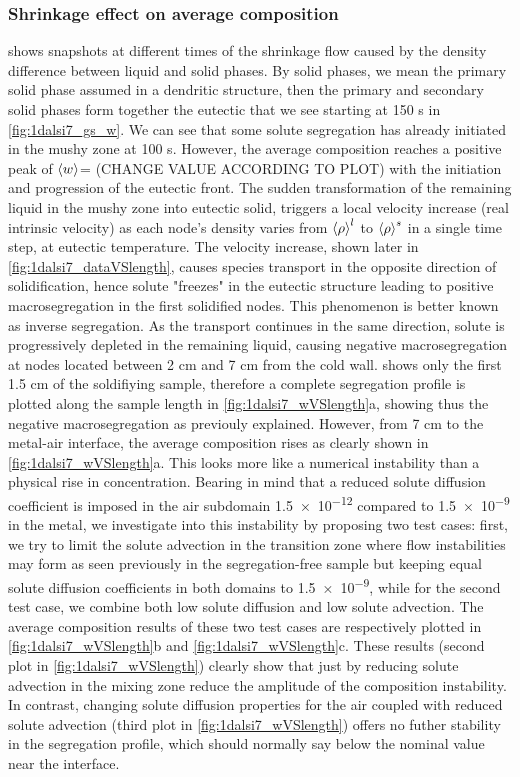 \subsubsection{Shrinkage effect on average composition}
 shows snapshots at different times of the shrinkage flow caused by the density difference between liquid and solid phases.
By solid phases, we mean the primary solid phase assumed in a dendritic structure, then the primary and secondary solid phases form together the eutectic
that we see starting at 150 s in \cref{fig:1dalsi7_gs_w}. We can see that some solute segregation has already initiated in the mushy zone at 100 s.
However, the average composition reaches a positive peak of $\left \langle w \right \rangle$= (CHANGE VALUE ACCORDING TO PLOT) with the initiation and progression of the eutectic front.
The sudden transformation of the remaining liquid in the mushy zone into eutectic solid, triggers a local velocity increase (real intrinsic velocity)
as each node's density varies from $\left \langle \rho \right \rangle^l$ to $\left \langle \rho \right \rangle^s$ in a single time step, at eutectic temperature. The velocity increase, shown later in \cref{fig:1dalsi7_dataVSlength},
causes species transport in the opposite direction of solidification, hence solute "freezes" in the eutectic structure leading to positive macrosegregation
in the first solidified nodes. This phenomenon is better known as inverse segregation. 
As the transport continues in the same direction, 
solute is progressively depleted in the remaining liquid, causing negative macrosegregation at nodes located between 2 cm and 7 cm from the cold wall.
 shows only the first 1.5 cm of the soldifiying sample, therefore a complete segregation profile is plotted along the sample length in \cref{fig:1dalsi7_wVSlength}a,
showing thus the negative macrosegregation as previouly explained.
However, from 7 cm to the metal-air interface, the average composition rises as clearly shown in \cref{fig:1dalsi7_wVSlength}a. This looks more like a numerical
instability than a physical rise in concentration. 
Bearing in mind that a reduced solute diffusion coefficient is imposed in the air subdomain \SI{1.5e-12}{\udiffusivity} compared to 
\SI{1.5e-9}{\udiffusivity} in the metal, we investigate into this instability by proposing two test cases: first, we try to limit the solute advection in the transition
zone where flow instabilities may form as seen previously in the segregation-free sample but keeping equal solute diffusion coefficients in both domains to \SI{1.5e-9}{\udiffusivity},
while for the second test case, we combine both low solute diffusion and low solute advection. The average composition results of these two test cases
are respectively plotted in \cref{fig:1dalsi7_wVSlength}b and \cref{fig:1dalsi7_wVSlength}c.
These results (second plot in \cref{fig:1dalsi7_wVSlength})  clearly show that just by reducing solute advection in the mixing zone reduce the amplitude of the composition instability.
In contrast, changing solute diffusion properties for the air coupled with reduced solute advection (third plot in \cref{fig:1dalsi7_wVSlength}) offers no futher stability
in the segregation profile, which should normally say below the nominal value near the interface.

